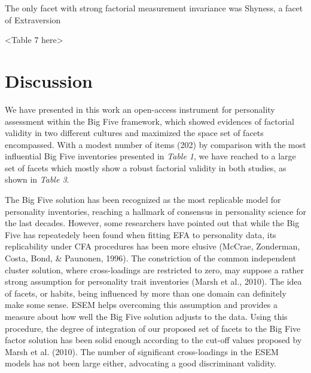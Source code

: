 \documentclass[,man]{apa6}
\theoremstyle{definition}
\theoremstyle{definition}
\theoremstyle{definition}
\theoremstyle{remark}
\begin{document}
The only facet with strong factorial measurement invariance was Shyness,
a facet of Extraversion

\vspace{5mm}

\textless{}Table 7 here\textgreater{}

\vspace{5mm}

\hypertarget{discussion}{%
\section{Discussion}\label{discussion}}

We have presented in this work an open-access instrument for personality
assessment within the Big Five framework, which showed evidences of
factorial validity in two different cultures and maximized the space set
of facets encompassed. With a modest number of items (202) by comparison
with the most influential Big Five inventories presented in \emph{Table
1}, we have reached to a large set of facets which mostly show a robust
factorial validity in both studies, as shown in \emph{Table 3}.

The Big Five solution has been recognized as the most replicable model
for personality inventories, reaching a hallmark of consensus in
personality science for the last decades. However, some researchers have
pointed out that while the Big Five has repeatedely been found when
fitting EFA to personality data, its replicability under CFA procedures
has been more elusive (McCrae, Zonderman, Costa, Bond, \& Paunonen,
1996). The constriction of the common independent cluster solution,
where cross-loadings are restricted to zero, may suppose a rather strong
assumption for personality trait inventories (Marsh et al., 2010). The
idea of facets, or habits, being influenced by more than one domain can
definitely make some sense. ESEM helps overcoming this assumption and
provides a measure about how well the Big Five solution adjusts to the
data. Using this procedure, the degree of integration of our proposed
set of facets to the Big Five factor solution has been solid enough
according to the cut-off values proposed by Marsh et al. (2010). The
number of significant cross-loadings in the ESEM models has not been
large either, advocating a good discriminant validity.
\end{document}
